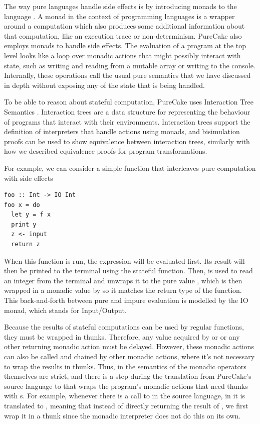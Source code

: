 The way pure languages handle side effects is by introducing monads to the
language \cite{benton2000monads}. A monad in the context of programming
languages is a wrapper around a computation which also produces some additional
information about that computation, like an execution trace or non-determinism.
PureCake also employs monads to handle side effects. The evaluation of a
\ThunkLang{} program at the top level looks like a loop over monadic actions
that might possibly interact with state, such as writing and reading from a
mutable array or writing to the console. Internally, these operations call the
usual pure semantics that we have discussed in depth without exposing any of the
state that is being handled.

To be able to reason about stateful computation, PureCake uses Interaction Tree
Semantics \cite{xia2019interaction}. Interaction trees are a data structure for
representing the behaviour of programs that interact with their environments.
Interaction trees support the definition of interpreters that handle actions
using monads, and bisimulation proofs can be used to show equivalence between
interaction trees, similarly with how we described equivalence proofs for
program transformations.

For example, we can consider a simple function that interleaves pure computation
with side effects
\begin{verbatim}
foo :: Int -> IO Int
foo x = do
  let y = f x
  print y
  z <- input
  return z
\end{verbatim}
When this function is run, the  expression will be evaluated first. Its
result will then be printed to the terminal using the stateful 
function. Then,  is used to read an integer from the terminal and
unwraps it to the pure value , which is then wrapped in a monadic value
by  so it matches the return type of the function. This
back-and-forth between pure and impure evaluation is modelled by the IO monad,
which stands for Input/Output.

Because the results of stateful computations can be used by regular functions,
they must be wrapped in thunks. Therefore, any value acquired by  or
 or any other returning monadic action must be delayed. However,
these monadic actions can also be called and chained by other monadic actions,
where it's not necessary to wrap the results in thunks. Thus, in \ThunkLang{}
the semantics of the monadic operators themselves are strict, and there is a
step during the translation from PureCake's source language to \ThunkLang{} that
wraps the program's monadic actions that need thunks with s. For
example, whenever there is a call to  in the source language, in
\ThunkLang{} it is translated to ,
meaning that instead of directly returning the result of , we first
wrap it in a thunk since the monadic interpreter does not do this on its own.

